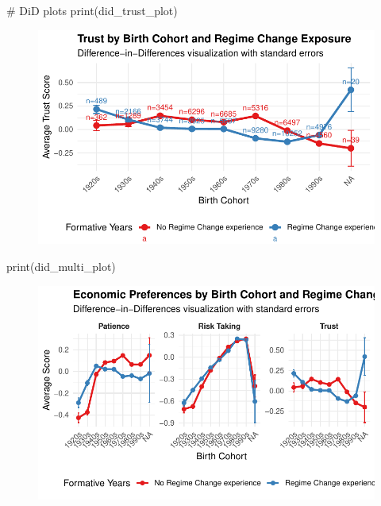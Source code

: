 \documentclass[
  letterpaper,
  DIV=11,
  numbers=noendperiod]{scrartcl}
\newenvironment{Shaded}{\begin{snugshade}}{\end{snugshade}}
\newcommand{\CommentTok}[1]{\textcolor[rgb]{0.37,0.37,0.37}{#1}}
\newcommand{\FunctionTok}[1]{\textcolor[rgb]{0.28,0.35,0.67}{#1}}
\newcommand{\NormalTok}[1]{\textcolor[rgb]{0.00,0.23,0.31}{#1}}
\begin{document}
\begin{Shaded}
\begin{Highlighting}[]
\CommentTok{\# DiD plots}
\FunctionTok{print}\NormalTok{(did\_trust\_plot)}
\end{Highlighting}
\end{Shaded}

\begin{figure}[H]

{\centering \includegraphics{Milestone-2-Data_files/figure-pdf/unnamed-chunk-9-4.pdf}

}

\end{figure}

\begin{Shaded}
\begin{Highlighting}[]
\FunctionTok{print}\NormalTok{(did\_multi\_plot)}
\end{Highlighting}
\end{Shaded}

\begin{figure}[H]

{\centering \includegraphics{Milestone-2-Data_files/figure-pdf/unnamed-chunk-9-5.pdf}

}

\end{figure}
\end{document}
